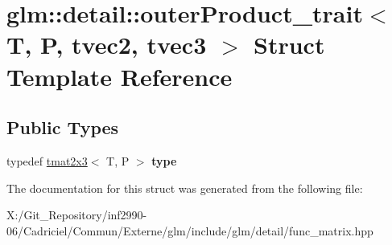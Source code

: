 \hypertarget{structglm_1_1detail_1_1outer_product__trait_3_01_t_00_01_p_00_01tvec2_00_01tvec3_01_4}{\section{glm\-:\-:detail\-:\-:outer\-Product\-\_\-trait$<$ T, P, tvec2, tvec3 $>$ Struct Template Reference}
\label{structglm_1_1detail_1_1outer_product__trait_3_01_t_00_01_p_00_01tvec2_00_01tvec3_01_4}
}
\subsection*{Public Types}
\begin{DoxyCompactItemize}
\item 
\hypertarget{structglm_1_1detail_1_1outer_product__trait_3_01_t_00_01_p_00_01tvec2_00_01tvec3_01_4_a960af058d12b8de3d79562804f768d0d}{typedef \hyperlink{structglm_1_1detail_1_1tmat2x3}{tmat2x3}$<$ T, P $>$ {\bfseries type}}\label{structglm_1_1detail_1_1outer_product__trait_3_01_t_00_01_p_00_01tvec2_00_01tvec3_01_4_a960af058d12b8de3d79562804f768d0d}

\end{DoxyCompactItemize}


The documentation for this struct was generated from the following file\-:\begin{DoxyCompactItemize}
\item 
X\-:/\-Git\-\_\-\-Repository/inf2990-\/06/\-Cadriciel/\-Commun/\-Externe/glm/include/glm/detail/func\-\_\-matrix.\-hpp\end{DoxyCompactItemize}
